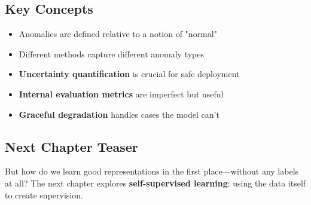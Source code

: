 \subsection{Key Concepts}
\begin{itemize}
    \item Anomalies are defined relative to a notion of "normal"
    \item Different methods capture different anomaly types
    \item \textbf{Uncertainty quantification} is crucial for safe deployment
    \item \textbf{Internal evaluation metrics} are imperfect but useful
    \item \textbf{Graceful degradation} handles cases the model can't
\end{itemize}

\subsection{Next Chapter Teaser}
 But how do we learn good representations in the first place---without any labels at all? The next chapter explores \textbf{self-supervised learning}: using the data itself to create supervision.
